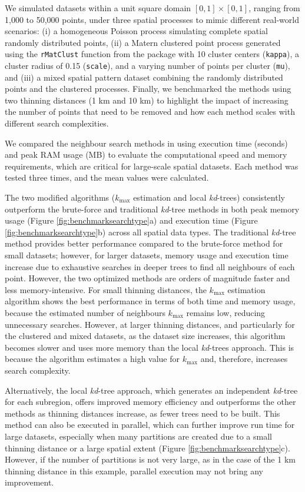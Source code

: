 We simulated datasets within a unit square domain \([0,1] \times [0,1]\), ranging from 1,000 to 50,000 points, under three spatial processes to mimic different real-world scenarios: (i) a homogeneous Poisson process simulating complete spatial randomly distributed points, (ii) a Matern clustered point process generated using the \texttt{rMatClust} function from the  package \citep{spatstatRpackage} with 10 cluster centers (\texttt{kappa}), a cluster radius of 0.15 (\texttt{scale}), and a varying number of points per cluster (\texttt{mu}), and (iii) a mixed spatial pattern dataset combining the randomly distributed points and the clustered processes. Finally, we benchmarked the methods using two thinning distances (1 km and 10 km) to highlight the impact of increasing the number of points that need to be removed and how each method scales with different search complexities.

We compared the neighbour search methods in  using execution time (seconds) and peak RAM usage (MB) to evaluate the computational speed and memory requirements, which are critical for large-scale spatial datasets. Each method was tested three times, and the mean values were calculated.

The two modified algorithms (\(k_\text{max}\) estimation and local \emph{kd}-trees) consistently outperform the brute-force and traditional \emph{kd}-tree methods in both peak memory usage (Figure \ref{fig:benchmarksearchtype}a) and execution time (Figure \ref{fig:benchmarksearchtype}b) across all spatial data types. The traditional \emph{kd}-tree method provides better performance compared to the brute-force method for small datasets; however, for larger datasets, memory usage and execution time increase due to exhaustive searches in deeper trees to find all neighbours of each point. However, the two optimized methods are orders of magnitude faster and less memory-intensive. For small thinning distances, the \(k_\text{max}\) estimation algorithm shows the best performance in terms of both time and memory usage, because the estimated number of neighbours \(k_\text{max}\) remains low, reducing unnecessary searches. However, at larger thinning distances, and particularly for the clustered and mixed datasets, as the dataset size increases, this algorithm becomes slower and uses more memory than the local \emph{kd}-trees approach. This is because the algorithm estimates a high value for \(k_\text{max}\) and, therefore, increases search complexity.

Alternatively, the local \emph{kd}-tree approach, which generates an independent \emph{kd}-tree for each subregion, offers improved memory efficiency and outperforms the other methods as thinning distances increase, as fewer trees need to be built. This method can also be executed in parallel, which can further improve run time for large datasets, especially when many partitions are created due to a small thinning distance or a large spatial extent (Figure \ref{fig:benchmarksearchtype}c). However, if the number of partitions is not very large, as in the case of the 1 km thinning distance in this example, parallel execution may not bring any improvement.

